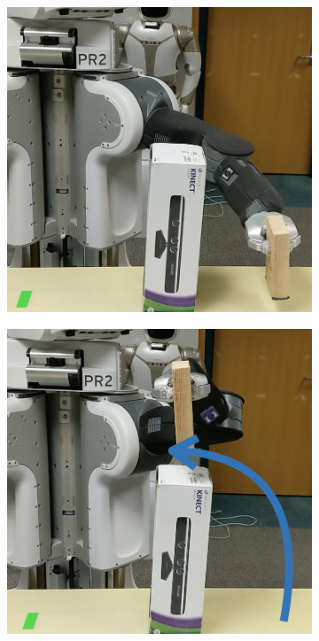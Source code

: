 \begin{figure}[t]
  \centering
  \begin{subfigure}{0.24\linewidth}
    \includegraphics[width=\linewidth]{figures/cmax/pr2_pick_place_light_1_annotated.jpeg}
  \end{subfigure}
  \begin{subfigure}{0.24\linewidth}
    \includegraphics[width=\linewidth]{figures/cmax/pr2_pick_place_light_2_annotated.jpeg}

\end{subfigure}
\end{figure}
